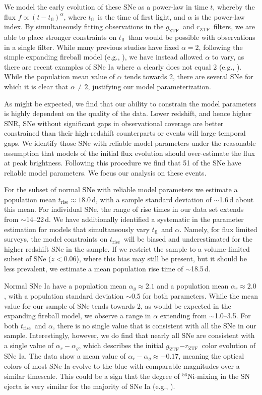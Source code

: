 \documentclass[twocolumn]{./aastex63}
\newcommand{\rztf}{$r_\mathrm{ZTF}$}
\newcommand{\gztf}{$g_\mathrm{ZTF}$}
\newcommand{\tfl}{$t_\mathrm{fl}$}
\newcommand{\trise}{$t_\mathrm{rise}$}
\begin{document}
We model the early evolution of these SNe as a power-law in time $t$, whereby
the flux $f \propto (t - t_\mathrm{fl})^\alpha$, where \tfl\ is the time of
first light, and $\alpha$ is the power-law index. By simultaneously fitting
observations in the \gztf\ and \rztf\ filters, we are able to place stronger
constraints on \tfl\ than would be possible with observations in a single
filter. While many previous studies have fixed $\alpha = 2$, following the
simple expanding fireball model (e.g., \citealt{Riess99a}), we have instead
allowed $\alpha$ to vary, as there are recent examples of SNe Ia where $\alpha$
clearly does not equal 2 (e.g., \citealt{Zheng13, Miller18,Shappee16}). While
the population mean value of $\alpha$ tends towards 2, there are several SNe for
which it is clear that $\alpha \ne 2$, justifying our model parameterization.

As might be expected, we find that our ability to constrain the model parameters
is highly dependent on the quality of the data. Lower redshift, and hence higher
SNR, SNe without significant gaps in observational coverage are better
constrained than their high-redshift counterparts or events will large temporal
gaps. We identify those SNe with reliable model parameters under the reasonable
assumption that models of the initial flux evolution should over-estimate the
flux at peak brightness. Following this procedure we find that 51 of the SNe
have reliable model parameters. We focus our analysis on these events.

For the subset of normal SNe with reliable model parameters we estimate a
population mean \trise$ \approx 18.0$\,d, with a sample standard deviation of
$\sim$1.6\,d about this mean. For individual SNe, the range of rise times in our
data set extends from $\sim$14--22\,d. We have additionally identified a
systematic in the parameter estimation for models that simultaneously vary \tfl\
and $\alpha$. Namely, for flux limited surveys, the model constraints on \trise\
will be biased and underestimated for the higher redshift SNe in the sample. If
we restrict the sample to a volume-limited subset of SNe ($z < 0.06$), where
this bias may still be present, but it should be less prevalent, we estimate a
mean population rise time of $\sim$18.5\,d.

Normal SNe Ia have a population mean $\alpha_g \approx 2.1$ and a population
mean $\alpha_r \approx 2.0$, with a population standard deviation $\sim$0.5 for
both parameters. While the mean value for our sample of SNe tends towards 2, as
would be expected in the expanding fireball model, we observe a range in
$\alpha$ extending from $\sim$1.0--3.5. For both \trise\ and $\alpha$, there is
no single value that is consistent with all the SNe in our sample.
Interestingly, however, we do find that nearly all SNe are consistent with a
single value of $\alpha_r - \alpha_g$, which describes the initial \gztf$ -
$\rztf\ color evolution of SNe Ia. The data show a mean value of $\alpha_r -
\alpha_g \approx -0.17$, meaning the optical colors of most SNe Ia evolve to the
blue with comparable magnitudes over a similar timescale. This could be a sign
that the degree of $^{56}$Ni-mixing in the SN ejecta is very similar for the
majority of SNe Ia (e.g., \citealt{Piro16}).
\end{document}
